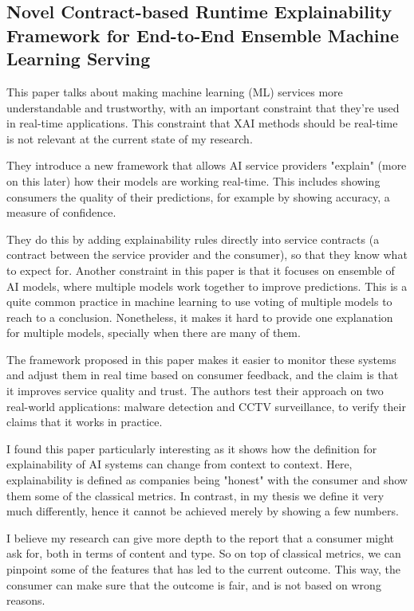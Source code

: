 \subsection{Novel Contract-based Runtime Explainability Framework for End-to-End Ensemble Machine Learning Serving \cite{pp1}}

This paper talks about making machine learning (ML) services more understandable and trustworthy, with an important constraint that they're used in real-time applications. This constraint that XAI methods should be real-time is not relevant at the current state of my research. 



They introduce a new framework that allows AI service providers "explain" (more on this later) how their models are working real-time. This includes showing consumers the quality of their predictions, for example by showing accuracy, a measure of confidence. 



They do this by adding explainability rules directly into service contracts (a contract between the service provider and the consumer), so that they know what to expect for. Another constraint in this paper is that it focuses on ensemble of AI models, where multiple models work together to improve predictions. This is a quite common practice in machine learning to use voting of multiple models to reach to a conclusion. Nonetheless, it makes it hard to provide one explanation for multiple models, specially when there are many of them.



The framework proposed in this paper makes it easier to monitor these systems and adjust them in real time based on consumer feedback, and the claim is that it improves service quality and trust. The authors test their approach on two real-world applications: malware detection and CCTV surveillance, to verify their claims that it works in practice.



I found this paper particularly interesting as it shows how the definition for explainability of AI systems can change from context to context. Here, explainability is defined as companies being "honest" with the consumer and show them some of the classical metrics. In contrast, in my thesis we define it very much differently, hence it cannot be achieved merely by showing a few numbers.

I believe my research can give more depth to the report that a consumer might ask for, both in terms of content and type. So on top of classical metrics, we can pinpoint some of the features that has led to the current outcome. This way, the consumer can make sure that the outcome is fair, and is not based on wrong reasons.

